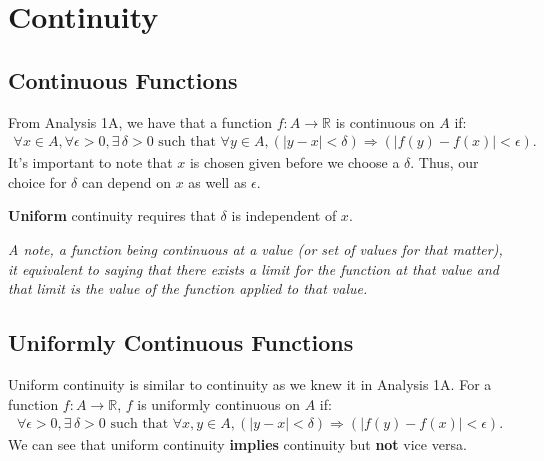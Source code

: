 \documentclass[a4paper, 12pt, twoside]{article}
\begin{document}
\newpage

\section{Continuity}

\subsection{Continuous Functions}

From Analysis 1A, we have that a function $f: A \to \mathbb{R}$
is continuous on $A$ if:
\begin{align*}
      \forall x \in A, \forall \epsilon > 0, \exists\,\delta > 0
      \text{ such that } \forall y \in A,
      (|y - x| < \delta) \Rightarrow (|f(y) - f(x)| < \epsilon).
\end{align*}
It's important to note that $x$ is chosen given before we choose a
$\delta$. Thus, our choice for $\delta$ can depend on $x$ as well as
$\epsilon$.

\vspace{\baselineskip}

\textbf{Uniform} continuity requires that $\delta$ is independent of
$x$.

\vspace{\baselineskip}

\textit{A note, a function being continuous at a value (or set
      of values for that matter), it equivalent to saying that
      there exists a limit for the function at that value and that limit
      is the value of the function applied to that value.}

\subsection{Uniformly Continuous Functions}

Uniform continuity is similar to continuity as we knew it in Analysis
1A. For a function $f : A \to \mathbb{R}$, $f$ is uniformly continuous
on $A$ if:
\begin{align*}
      \forall \epsilon > 0, \exists\,\delta > 0
      \text{ such that } \forall x, y \in A,
      (|y - x| < \delta) \Rightarrow (|f(y) - f(x)| < \epsilon).
\end{align*}
We can see that uniform continuity \textbf{implies} continuity but
\textbf{not} vice versa.

\vspace{\baselineskip}
\end{document}
